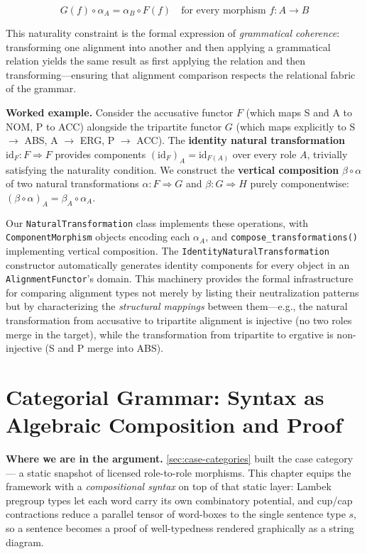 \documentclass[
]{article}
\begin{document}
\begin{equation}
G(f) \circ \alpha_A = \alpha_B \circ F(f) \quad \text{for every morphism } f: A \to B
\label{eq:eq-2-2}
\end{equation}

This naturality constraint is the formal expression of \emph{grammatical
coherence}: transforming one alignment into another and then applying a
grammatical relation yields the same result as first applying the
relation and then transforming---ensuring that alignment comparison
respects the relational fabric of the grammar.

\textbf{Worked example.} Consider the accusative functor \(F\) (which
maps S and A to NOM, P to ACC) alongside the tripartite functor \(G\)
(which maps explicitly to S \(\to\) ABS, A \(\to\) ERG, P \(\to\) ACC).
The \textbf{identity natural transformation}
\(\text{id}_F: F \Rightarrow F\) provides components
\({(\text{id}_F)}_A = \text{id}_{F{(A)}}\) over every role \(A\),
trivially satisfying the naturality condition. We construct the
\textbf{vertical composition} \(\beta \circ \alpha{}\) of two natural
transformations \(\alpha: F \Rightarrow G\) and
\(\beta: G \Rightarrow H\) purely componentwise:
\({(\beta \circ \alpha)}_A = \beta_A \circ \alpha_A\).

Our \texttt{NaturalTransformation} class implements these operations,
with \texttt{ComponentMorphism} objects encoding each \(\alpha_A\), and
\texttt{compose\_transformations()} implementing vertical composition.
The \texttt{IdentityNaturalTransformation} constructor automatically
generates identity components for every object in an
\texttt{AlignmentFunctor}'s domain. This machinery provides the formal
infrastructure for comparing alignment types not merely by listing their
neutralization patterns but by characterizing the \emph{structural
mappings} between them---e.g., the natural transformation from
accusative to tripartite alignment is injective (no two roles merge in
the target), while the transformation from tripartite to ergative is
non-injective (S and P merge into ABS).

\newpage

\section{Categorial Grammar: Syntax as Algebraic Composition and
Proof}\label{sec:categorial-grammar}

\textbf{Where we are in the argument.} \autoref{sec:case-categories}
built the case category --- a static snapshot of licensed role-to-role
morphisms. This chapter equips the framework with a \emph{compositional
syntax} on top of that static layer: Lambek pregroup types let each word
carry its own combinatory potential, and cup/cap contractions reduce a
parallel tensor of word-boxes to the single sentence type \(s\), so a
sentence becomes a proof of well-typedness rendered graphically as a
string diagram.
\end{document}
